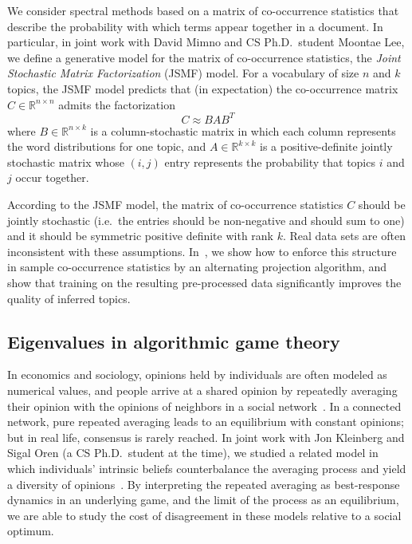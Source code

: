 \documentclass[11pt]{amsart}
\newcommand{\bbR}{\mathbb{R}}
\begin{document}
We consider spectral methods
based on a matrix of co-occurrence statistics that
describe the probability with which terms appear together in a document.
In particular, in joint work with David Mimno and CS Ph.D.~student
Moontae Lee, we define a generative model for the matrix of
co-occurrence statistics, the {\em Joint Stochastic Matrix
Factorization} (JSMF) model.  For a vocabulary of size $n$ and $k$
topics, the JSMF model predicts that (in expectation) the
co-occurrence matrix $C\in \bbR^{n \times n}$ admits the
factorization
\[
  C \approx B A B^T
\]
where $B \in \bbR^{n \times k}$ is
a column-stochastic matrix in which each column represents the word
distributions for one topic, and $A \in \bbR^{k \times k}$ is a
positive-definite jointly stochastic matrix whose $(i,j)$ entry
represents the probability that topics $i$ and $j$ occur together.

According to the JSMF model, the matrix of co-occurrence statistics $C$
should be jointly stochastic (i.e.~the entries should be non-negative
and should sum to one) and it should be symmetric positive definite with
rank $k$.  Real data sets are often inconsistent with these assumptions.
In~\cite{2015-nips}, we show how to enforce this structure in
sample co-occurrence statistics by an alternating projection algorithm,
and show that training on the resulting pre-processed data significantly
improves the quality of inferred topics.

\subsection*{Eigenvalues in algorithmic game theory}

In economics and sociology, opinions held by individuals are often
modeled as numerical values, and people arrive at a shared opinion by
repeatedly averaging their opinion with the opinions of neighbors in a
social network~\cite{Degroot:1974:Opinions}.  In a connected network, pure repeated averaging leads
to an equilibrium with constant opinions; but in
real life, consensus is rarely reached. In joint work with Jon
Kleinberg and Sigal Oren (a CS Ph.D.~student at the time),
we studied a related model in which individuals’ intrinsic beliefs
counterbalance the averaging process and yield a diversity of opinions~\cite{2011-focs,2015-geb}.
By interpreting the repeated averaging as best-response dynamics in an
underlying game, and the limit of the process as an
equilibrium, we are able to study the cost of disagreement in these
models relative to a social optimum.
\end{document}
